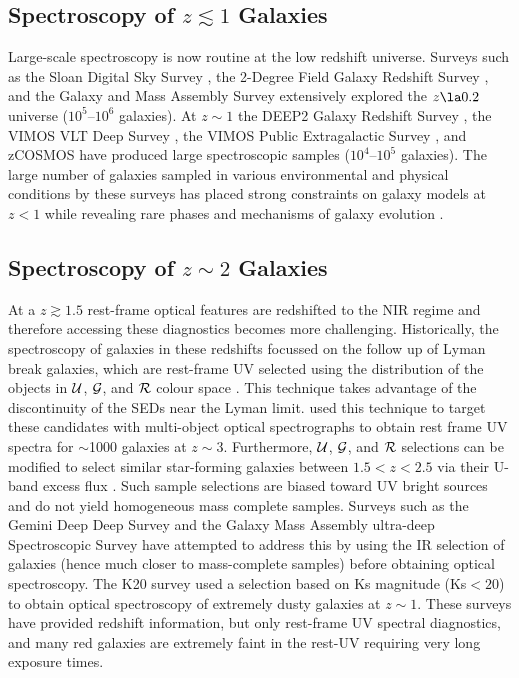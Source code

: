 \documentclass[iop]{emulateapj}
\newcommand{\around}{$\sim$}
\begin{document}
\subsection{Spectroscopy of $z\lesssim1$ Galaxies}


Large-scale spectroscopy is now routine at the low redshift universe. 
Surveys such as the Sloan Digital Sky Survey \citep[][]{York2000}, the 2-Degree Field Galaxy Redshift Survey \citep[][]{Colless2001}, and the Galaxy and Mass Assembly Survey \citep[][]{Driver2009} extensively explored the $z\la 0.2$ universe ($10^5$--$10^6$ galaxies). At  $z\sim 1$
the DEEP2 Galaxy Redshift Survey \citep{Newman2013}, the VIMOS VLT Deep Survey \citep{LeFevre2005}, the VIMOS Public Extragalactic Survey \citep{Garilli2014}, and zCOSMOS \citep{Lilly2007}  have produced large spectroscopic samples ($10^4$--$10^5$ galaxies). 
The large number of galaxies sampled in various environmental and physical conditions by these surveys has placed strong constraints on galaxy models at $z<1$ while revealing rare phases and mechanisms of galaxy evolution \cite[e.g.,][]{Cooper2007,Coil2008,Cheung2012,Newman2013}.   


\subsection{Spectroscopy of $z\sim2$ Galaxies}



At a $z\gtrsim1.5$ rest-frame optical features are redshifted to the NIR regime and therefore accessing these diagnostics becomes more challenging. Historically, the spectroscopy of galaxies in these redshifts focussed on the follow up of Lyman break galaxies, which are rest-frame UV selected  using the distribution of the objects in $\cal{U}$, $\cal{G}$, and $\cal{R}$ colour space \citep{Steidel1992}. This technique takes advantage of the discontinuity of the SEDs near the Lyman limit. \citet{Steidel2003} used this technique to target these candidates with multi-object optical spectrographs to obtain rest frame UV spectra for \around1000 galaxies at $z\sim3$. 
Furthermore, $\cal{U}$, $\cal{G}$, and $\cal{R}$ selections can be modified to select similar star-forming galaxies between $1.5<z<2.5$ via their U-band excess flux \citep{Steidel2004}. 
Such sample selections are biased toward UV bright sources and do not yield homogeneous mass complete samples. Surveys such as the Gemini Deep Deep Survey \citep[][]{Abraham2004} and the Galaxy Mass Assembly ultra-deep Spectroscopic Survey \citep[][]{Kurk2013} have attempted to address this by using the IR selection of galaxies (hence much closer to mass-complete samples) before obtaining optical spectroscopy.  
The K20 survey \citep{Cimatti2002} used a selection based on Ks magnitude (Ks$<20$) to obtain optical spectroscopy of extremely dusty galaxies at $z\sim1$. 
These surveys have provided redshift information, but only rest-frame UV spectral diagnostics, and many red galaxies are extremely faint in the rest-UV requiring very long exposure times.
\end{document}
